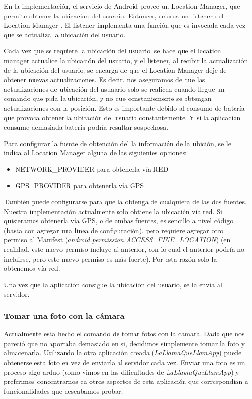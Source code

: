 En la implementación, el servicio de Android provee un Location Manager, que permite obtener la ubicación del usuario. Entonces, 
se crea un listener del Location Manager . El listener implementa una función que es invocada cada vez que se actualiza la ubicación del usuario.

Cada vez que se requiere la ubicación del usuario, se hace que el location manager actualice la ubicación del usuario, y el listener, al recibir la actualización de la ubicación del usuario, se encarga de que el Location Manager deje de obtener nuevas actualizaciones. Es decir, nos aseguramos de que las actualizaciones de ubicación del usuaario solo se realicen cuando llegue un comando que pida la ubicación, y no que constantemente se obtengan actualizaciones con la posición. Esto es importante debido al consumo de batería que provoca obtener la ubicación del usuario constantemente. Y si la aplicación consume demasiada batería podría resultar sospechosa.

Para configurar la fuente de obtención del la información de la ubición, se le indica al Location Manager alguna de las siguientes opciones:
\begin{itemize}
\item NETWORK\_PROVIDER para obtenerla vía RED
\item GPS\_PROVIDER para obtenerla vía GPS
\end{itemize}
También puede configurarse para que la obtenga de cualquiera de las dos fuentes. Nuestra implementación actualmente solo obtiene la ubicación vía red. Si quisieramos obtenerla vía GPS, o de ambas fuentes, es sencillo a nivel código (basta con agregar una linea de configuración), pero requiere agregar otro permiso al Manifest
(\textit{android.permission.ACCESS\_FINE\_LOCATION}) (en realidad, este nuevo permiso incluye al anterior, con lo cual el anterior podría no incluirse, pero este nuevo permiso es más fuerte). Por esta razón solo la obtenemos vía red.

Una vez que la aplicación consigue la ubicación del usuario, se la envía al servidor.

\subsubsection{Tomar una foto con la cámara}

Actualmente esta hecho el comando de tomar fotos con la cámara. Dado que nos pareció que
no aportaba demasiado en si, decidimos simplemente tomar la foto y almacenarla. Utilizando
la otra aplicación creada (\textit{LaLlamaQueLlamApp}) puede obtenerse esta foto en vez
de enviarla al servidor cada vez. Enviar una foto es un proceso algo arduo (como vimos en las
dificultades de \emph{LaLlamaQueLlamApp}) y preferimos concentrarnos en otros aspectos de esta
aplicación que correspondían a funcionalidades que deseabamos probar.

